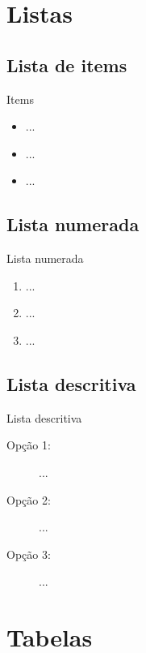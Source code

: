 \documentclass[table,xcolor=table]{apresentações/exemplo 2/IFMG-beamer}
\begin{document}
\section{Listas}

\subsection{Lista de items}

\begin{frame}{Items}

	\begin{itemize}[<+->]
		\item ...
    \item ...
    \item ...
  \end{itemize}
  
\end{frame} 

\subsection{Lista numerada}

\begin{frame}{Lista numerada}

	\begin{enumerate}[<+->]
		\item ...
    \item ...
    \item ...
  \end{enumerate}
  
\end{frame} 

\subsection{Lista descritiva} 

\begin{frame}{Lista descritiva} 

	\begin{description}
		\item [Opção 1:] ...
		\item [Opção 2:] ...
		\item [Opção 3:] ...
	\end{description}

\end{frame}


\section{Tabelas}
\end{document}
